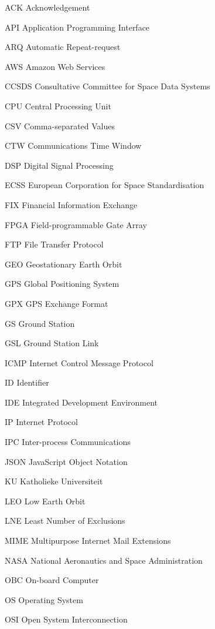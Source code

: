 \begin{Nomencl}[\gnat]
		\item[ACK]			Acknowledgement
		\item[API]				Application Programming Interface
		\item[ARQ]			Automatic Repeat-request
		\item[AWS]			Amazon Web Services
		\item[CCSDS]		Consultative Committee for Space Data Systems
		\item[CPU]			Central Processing Unit
		\item[CSV]			Comma-separated Values
		\item[CTW]			Communications Time Window
		\item[DSP]			Digital Signal Processing
		\item[ECSS]			European Corporation for Space Standardisation
		\item[FIX]				Financial Information Exchange
		\item[FPGA]			Field-programmable Gate Array
		\item[FTP]				File Transfer Protocol
		\item[GEO]			Geostationary Earth Orbit
		\item[GPS]			Global Positioning System
		\item[GPX]				GPS Exchange Format
		\item[GS]				Ground Station
		\item[GSL]				Ground Station Link
		\item[ICMP]			Internet Control Message Protocol
		\item[ID]				Identifier
		\item[IDE]				Integrated Development Environment
		\item[IP]				Internet Protocol
		\item[IPC]				Inter-process Communications
		\item[JSON]			JavaScript Object Notation
		\item[KU]				Katholieke Universiteit
		\item[LEO]				Low Earth Orbit
		\item[LNE]				Least Number of Exclusions
		\item[MIME]			Multipurpose Internet Mail Extensions
		\item[NASA]			National Aeronautics and Space Administration 
		\item[OBC]			On-board Computer
		\item[OS]				Operating System
		\item[OSI]				Open System Interconnection

\end{Nomencl}
